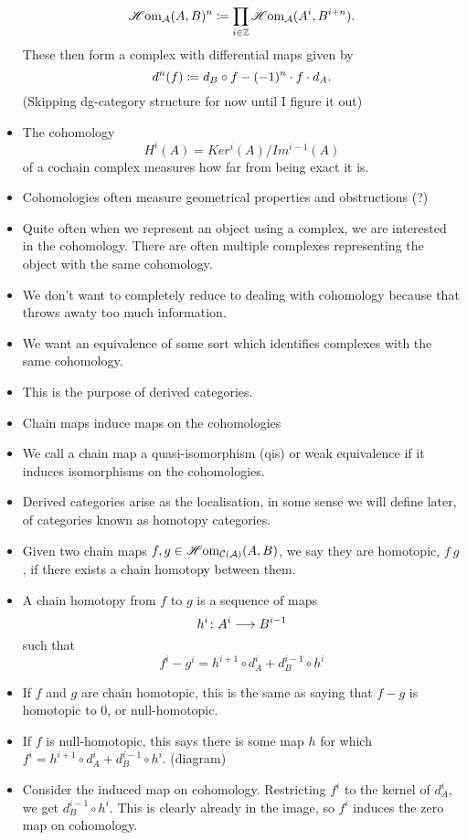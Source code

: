 \documentclass[a4paper]{article}
\begin{document}
\begin{itemize}
        \[
            \operatorname{\mathscr{H}om}_{\mathcal{A}}(A, B)^n \coloneqq \prod_{i \in \mathbb{Z}} \operatorname{\mathscr{H}om}_{\mathcal{A}}(A^i, B^{i+n}).
        \]
        These then form a complex with differential maps given by
        \[
            d^n(f) \coloneqq d_B \circ f - (-1)^n \cdot f \cdot d_A.
        \]
        (Skipping dg-category structure for now until I figure it out)
    \item The cohomology 
        \[
            H^i(A) = Ker^i(A)/Im^{i-1}(A)
        \]
        of a cochain complex measures how far from being exact it is. 
    \item Cohomologies often measure geometrical properties and obstructions (?)
    \item Quite often when we represent an object using a complex, we are interested in the cohomology. There are often multiple complexes representing the object with the same cohomology.
    \item We don't want to completely reduce to dealing with cohomology because that throws awaty too much information.
    \item We want an equivalence of some sort which identifies complexes with the same cohomology.
    \item This is the purpose of derived categories.
    \item Chain maps induce maps on the cohomologies
    \item We call a chain map a quasi-isomorphism (qis) or weak equivalence if it induces isomorphisms on the cohomologies. 
    \item Derived categories arise as the localisation, in some sense we will define later, of categories known as homotopy categories.
    \item Given two chain maps $f,g \in \operatorname{\mathscr{H}om}_{\mathcal{C}(\mathcal{A})}(A, B)$, we say they are homotopic, $f ~ g$, if there exists a chain homotopy between them.
    \item A chain homotopy from $f$ to $g$ is a sequence of maps
        \[
            h^i\colon A^i\longrightarrow B^{i-1}
        \]
        such that
        \[
            f^i - g^i = h^{i+1} \circ d^i_A + d^{i-1}_B \circ h^{i}
        \]
    \item If $f$ and $g$ are chain homotopic, this is the same as saying that $f-g$ is homotopic to $0$, or null-homotopic.
    \item If $f$ is null-homotopic, this says there is some map $h$ for which $f^i = h^{i+1} \circ d^i_A + d^{i-1}_B \circ h^i$. (diagram)
    \item Consider the induced map on cohomology. Restricting $f^i$ to the kernel of $d^i_A$, we get $d^{i-1}_B \circ h^i$. This is clearly already in the image, so $f^i$ induces the zero map on cohomology.

\end{itemize}
\end{document}
